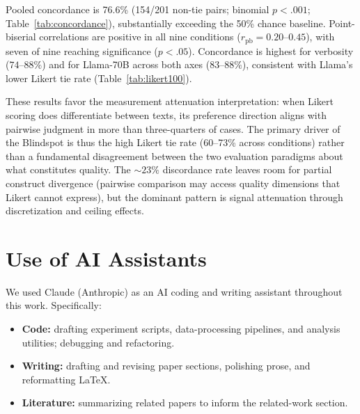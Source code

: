Pooled concordance is 76.6\% (154/201 non-tie pairs; binomial $p < .001$; Table~\ref{tab:concordance}), substantially exceeding the 50\% chance baseline.
Point-biserial correlations are positive in all nine conditions ($r_{\text{pb}} = 0.20$--$0.45$), with seven of nine reaching significance ($p < .05$).
Concordance is highest for verbosity ($74$--$88\%$) and for Llama-70B across both axes ($83$--$88\%$), consistent with Llama's lower Likert tie rate (Table~\ref{tab:likert100}).

These results favor the measurement attenuation interpretation: when Likert scoring does differentiate between texts, its preference direction aligns with pairwise judgment in more than three-quarters of cases.
The primary driver of the Blindspot is thus the high Likert tie rate (60--73\% across conditions) rather than a fundamental disagreement between the two evaluation paradigms about what constitutes quality.
The ${\sim}23\%$ discordance rate leaves room for partial construct divergence (pairwise comparison may access quality dimensions that Likert cannot express), but the dominant pattern is signal attenuation through discretization and ceiling effects.


\section*{Use of AI Assistants}
\label{app:ai-assistants}

\noindent We used Claude (Anthropic) as an AI coding and writing assistant throughout this work. Specifically:
\begin{itemize}
    \item \textbf{Code:} drafting experiment scripts, data-processing pipelines, and analysis utilities; debugging and refactoring.
    \item \textbf{Writing:} drafting and revising paper sections, polishing prose, and reformatting LaTeX.
    \item \textbf{Literature:} summarizing related papers to inform the related-work section.
\end{itemize}
